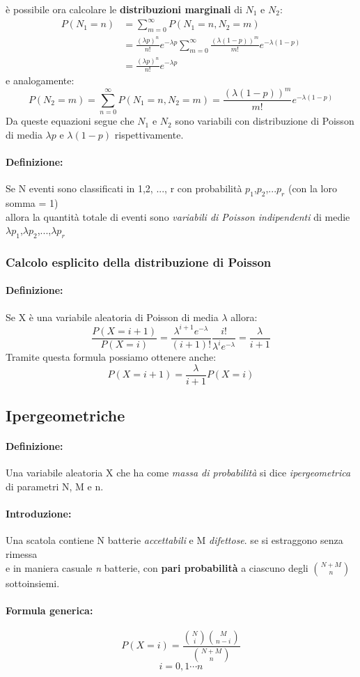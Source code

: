 \documentclass[]{article}
\newcommand{\definizione}{\paragraph{Definizione:}}
\newcommand{\formula}{\paragraph{Formula generica:}}
\begin{document}
    è possibile ora calcolare le \textbf{distribuzioni marginali} di $N_1$ e $N_2$:
    \begin{equation*}
        \begin{split}
            P(N_1 = n) &= \sum_{m = 0}^{\infty} P(N_1 = n, N_2 = m) \\
            & = \frac{(\lambda p)^n}{n!} e^{-\lambda p} \sum_{m = 0}^{\infty} \frac{(\lambda (1 - p))^m}{m!} e^{-\lambda(1-p)} \\
            & = \frac{(\lambda p)^n}{n!} e^{-\lambda p}
        \end{split}
    \end{equation*}
    e analogamente:
    \[ P(N_2 = m) = \sum_{n = 0}^{\infty} P(N_1 =n, N_2 = m) = \frac{(\lambda (1-p))^m}{m!} e^{-\lambda (1-p)} \]
    Da queste equazioni segue che $N_1$ e $N_2$ sono variabili con distribuzione di Poisson di media $\lambda p$ e $\lambda (1-p)$ rispettivamente.

    \definizione Se N eventi sono classificati in 1,2, ..., r con probabilità $p_1$,$p_2$,...$p_r$ (con la loro somma = 1) \\
    allora la quantità totale di eventi sono \textit{variabili di Poisson indipendenti} di medie $\lambda p_1$,$\lambda p_2$,...,$\lambda p_r$
    \subsubsection{Calcolo esplicito della distribuzione di Poisson}
    \definizione Se X è una variabile aleatoria di Poisson di media $\lambda$ allora:
    \[ \frac{P(X = i + 1)}{P(X = i)} = \frac{\lambda^{i+1} e^{-\lambda}}{(i+1)!} \frac{i!}{\lambda^i e^{-\lambda}} = \frac{\lambda}{i + 1} \]
    Tramite questa formula possiamo ottenere anche:
    \[ P(X = i + 1) = \frac{\lambda}{i + 1} P(X = i) \]
    \subsection{Ipergeometriche}
    \definizione Una variabile aleatoria X che ha come \textit{massa di probabilità} si dice \textit{ipergeometrica} di parametri N, M e n.
    \paragraph{Introduzione:}
    Una scatola contiene N batterie \textit{accettabili} e M \textit{difettose}. se si estraggono senza rimessa \\
    e in maniera casuale \textit{n} batterie, con \textbf{pari probabilità} a ciascuno degli $\binom{N + M}{n}$ sottoinsiemi.
    \formula
    \[  P(X = i) = \frac{\binom{N}{i} \binom{M}{n - i}}{\binom{N + M}{n}} \]
    \[ i = 0,1 \cdots n \]
\end{document}
